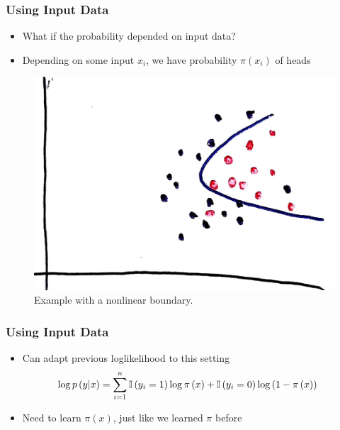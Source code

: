 \documentclass[10pt,mathserif]{beamer}
\begin{document}
\begin{frame}
  \frametitle{Using Input Data}
  \begin{itemize}
  \item What if the probability depended on input data?
  \item Depending on some input $x_i$, we have probability $\pi\left(x_i\right)$
    of heads
  \end{itemize}
  \begin{figure}
    \centering
    \includegraphics[width=0.45\paperwidth]{figure/logistic_scatter_nonlinear}
    \caption{Example with a nonlinear
      boundary. \label{fig:logistic_nonlinear_scatter_points} }
  \end{figure}
\end{frame}

\begin{frame}
  \frametitle{Using Input Data}
  \begin{itemize}
  \item Can adapt previous loglikelihood to this setting
    \begin{align*}
      \log p\left(y \vert x\right) &= \sum_{i = 1}^{n} \mathbb{I}\left({y_i = 1}\right)\log \pi\left(x\right) + \mathbb{I}\left({y_i = 0}\right)\log\left(1 - \pi\left(x\right)\right)
    \end{align*}
  \item Need to learn $\pi\left(x\right)$, just like we learned $\pi$ before
  \end{itemize}
\end{frame}
\end{document}
